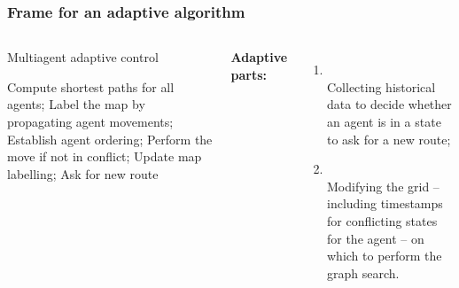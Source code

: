 \documentclass[12pt,aspectratio=169]{beamer}
\begin{document}
\begin{frame}[fragile,t]
  \frametitle{Frame for an adaptive algorithm}

{
\begin{columns}

\vspace*{-0.7cm}
\begin{minipage}{\linewidth}
  \begin{alertblock}{Multiagent adaptive control}
  \begin{algorithmic}[1]
  \Statex
  \State Compute shortest paths for \alert{all agents};
  \State Label the map by propagating agent movements;
  \State Establish agent ordering;
  \State Perform the move if not in conflict;
  \State Update map labelling;
  \State Ask for new route
  \EndIf
  \EndFor
  \EndWhile
  \end{algorithmic}
  \end{alertblock}
\end{minipage}

\vspace*{-0.5cm}

\textbf{Adaptive parts:}
\begin{enumerate}
\item {}\\
  Collecting historical data to decide whether an agent is in \alert{a state} to ask for a new route;\vspace*{.5cm}

\item {}\\
  Modifying the grid -- including timestamps for conflicting states for the agent -- on which to perform the graph search.
\end{enumerate}
\end{columns}

}
\end{frame}
\end{document}
